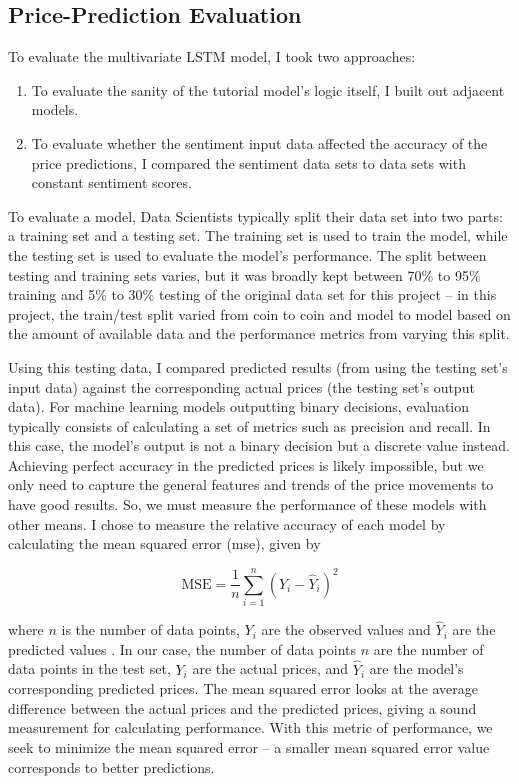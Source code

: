 \documentclass[10pt,twocolumn]{article}
\begin{document}
\subsection{Price-Prediction Evaluation} \label{price-prediction-evaluation}

To evaluate the multivariate LSTM model, I took two approaches:

\begin{enumerate}
    \item To evaluate the sanity of the tutorial model's logic itself, I built out adjacent models.
    \item To evaluate whether the sentiment input data affected the accuracy of the price predictions, I compared the sentiment data sets to data sets with constant sentiment scores.
\end{enumerate}

To evaluate a model, Data Scientists typically split their data set into two parts: a training set and a testing set. The training set is used to train the model, while the testing set is used to evaluate the model's performance. The split between testing and training sets varies, but it was broadly kept between 70\% to 95\% training and 5\% to 30\% testing of the original data set for this project -- in this project, the train/test split varied from coin to coin and model to model based on the amount of available data and the performance metrics from varying this split.

Using this testing data, I compared predicted results (from using the testing set's input data) against the corresponding actual prices (the testing set's output data). For machine learning models outputting binary decisions, evaluation typically consists of calculating a set of metrics such as precision and recall. In this case, the model's output is not a binary decision but a discrete value instead. Achieving perfect accuracy in the predicted prices is likely impossible, but we only need to capture the general features and trends of the price movements to have good results. So, we must measure the performance of these models with other means. I chose to measure the relative accuracy of each model by calculating the mean squared error (mse), given by

\begin{equation}
    \text{MSE} = \frac{1}{n} \sum_{i=1}^{n} (Y_i - \hat{Y}_i)^2
\end{equation}

\noindent where $n$ is the number of data points, $Y_i$ are the observed values and $\hat{Y}_i$ are the predicted values \cite{mseWikipedia}. In our case, the number of data points $n$ are the number of data points in the test set, $Y_i$ are the actual prices, and $\hat{Y}_i$ are the model's corresponding predicted prices. The mean squared error looks at the average difference between the actual prices and the predicted prices, giving a sound measurement for calculating performance. With this metric of performance, we seek to minimize the mean squared error -- a smaller mean squared error value corresponds to better predictions.
\end{document}
